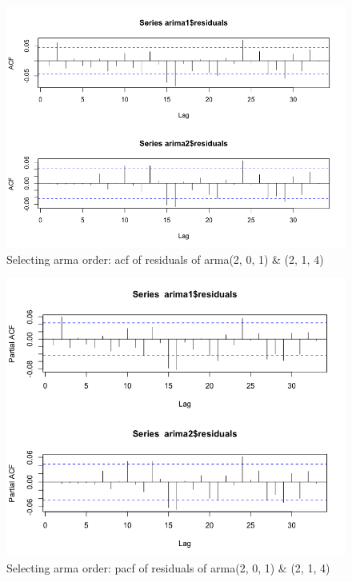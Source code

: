\documentclass[a4paper,10pt]{article}
\begin{document}
\begin{figure}[H]
\centering
\caption{Selecting arma order: acf of residuals of arma(2, 0, 1) \& (2, 1, 4)}
\includegraphics[scale=.5]{armaacf.png}
\end{figure}

\begin{figure}[H]
\centering
\caption{Selecting arma order: pacf of residuals of arma(2, 0, 1) \& (2, 1, 4)}
\includegraphics[scale=.5]{arima_pacf.png}
\end{figure}
\end{document}
